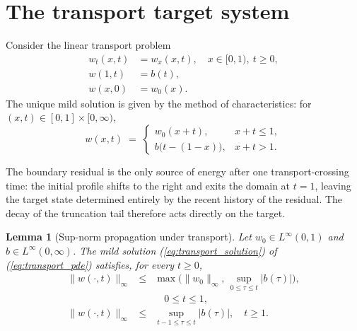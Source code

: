 \documentclass[10pt,a4paper]{amsart}
\newtheorem{lemma}{Lemma}
\newcommand{\Linf}{L^\infty}
\begin{document}
\section{The transport target system}\label{sec:transport}

Consider the linear transport problem
\begin{align}
w_t(x,t) &= w_x(x,t), \quad x \in [0,1),\ t \ge 0, \label{eq:transport_pde}\\
w(1,t) &= b(t), \label{eq:transport_bdy}\\
w(x,0) &= w_0(x). \label{eq:transport_ic}
\end{align}
The unique mild solution is given by the method of characteristics: for $(x,t) \in [0,1] \times [0,\infty)$,
\begin{equation}
w(x,t) \;=\; \begin{cases} w_0(x + t), & x + t \le 1,\\ b\bigl(t - (1-x)\bigr), & x + t > 1. \end{cases}
\label{eq:transport_solution}
\end{equation}

The boundary residual is the only source of energy after one transport-crossing time: the initial profile shifts to the right and exits the domain at $t = 1$, leaving the target state determined entirely by the recent history of the residual. The decay of the truncation tail therefore acts directly on the target.

\begin{lemma}[Sup-norm propagation under transport]\label{lem:transport}
Let $w_0 \in \Linf(0,1)$ and $b \in \Linf(0,\infty)$. The mild solution (\ref{eq:transport_solution}) of (\ref{eq:transport_pde}) satisfies, for every $t \ge 0$,
\begin{eqnarray}
\|w(\cdot,t)\|_\infty &\le& \max\bigl(\|w_0\|_\infty,\, \sup_{0\le \tau \le t} |b(\tau)|\bigr), \nonumber \\
&& \quad 0 \le t \le 1, \nonumber \\
\|w(\cdot,t)\|_\infty &\le& \sup_{t-1 \le \tau \le t}|b(\tau)|, \quad t \ge 1.
\label{eq:transport_bound}
\end{eqnarray}
\end{lemma}
\end{document}
